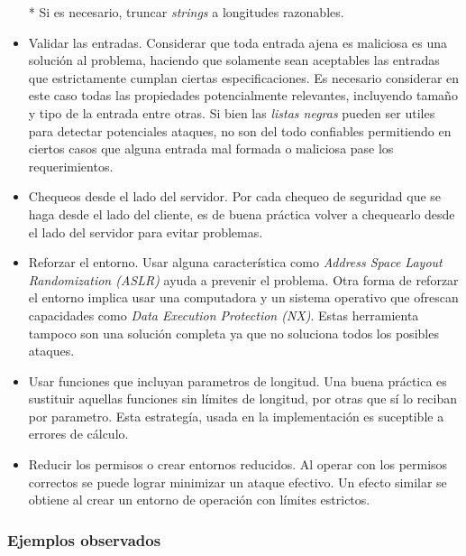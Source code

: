 \begin{itemize}
	* Si es necesario, truncar \textit{strings} a longitudes razonables.
    \item Validar las entradas.
	Considerar que toda entrada ajena es maliciosa es una solución al problema, haciendo que solamente sean aceptables las entradas que estrictamente cumplan ciertas especificaciones.
	Es necesario considerar en este caso todas las propiedades potencialmente relevantes, incluyendo tamaño y tipo de la entrada entre otras.
	Si bien las \textit{listas negras} pueden ser utiles para detectar potenciales ataques, no son del todo confiables permitiendo en ciertos casos que alguna entrada mal formada o maliciosa 
	pase los requerimientos.
    \item Chequeos desde el lado del servidor. Por cada chequeo de seguridad que se haga desde el lado del cliente, es de buena práctica volver a chequearlo desde el lado del servidor para 
	evitar problemas.
    \item Reforzar el entorno. Usar alguna característica como \textit{Address Space Layout Randomization (ASLR)} ayuda a prevenir el problema. 
	Otra forma de reforzar el entorno implica usar una computadora y un sistema operativo que ofrescan capacidades como \textit{Data Execution Protection (NX)}.
	Estas herramienta tampoco son una solución completa ya que no soluciona todos los posibles ataques.
    \item Usar funciones que incluyan parametros de longitud. Una buena práctica es sustituir aquellas funciones sin límites de longitud, por otras que sí lo reciban por parametro.
	Esta estrategía, usada en la implementación es suceptible a errores de cálculo.
    \item Reducir los permisos o crear entornos reducidos. Al operar con los permisos correctos se puede lograr minimizar un ataque efectivo. Un efecto similar se obtiene al crear un 
	entorno de operación con límites estrictos.
\end{itemize}

\subsubsection{Ejemplos observados}

